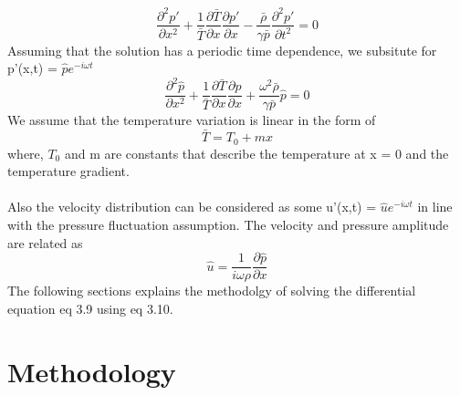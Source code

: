 \documentclass[8pt]{article} %
\begin{document}
\begin{equation}
\frac{\partial^2 p'}{\partial x^2} + \frac{1}{\bar{T}} \frac{\partial \bar{T}}{\partial x} \frac{\partial p'}{\partial x} - \frac{\bar{\rho}}{\gamma \bar{p} } \frac{\partial^2 p'}{\partial t^2} = 0
\end{equation}
Assuming that the solution has a periodic time dependence, we subsitute for p'(x,t) = $\hat{p} e^{- i \omega t}$
\begin{equation}
\frac{\partial^2 \hat{p}}{\partial x^2} + \frac{1}{\bar{T}} \frac{\partial \bar{T}}{\partial x} \frac{\partial \hat{p}}{\partial x} + \frac{\omega^2 \bar{\rho}}{\gamma \bar{p} } \hat{p} = 0
\end{equation}\label{eq:3.9}
We assume that the temperature variation is linear in the form of
\begin{equation}
	\bar{T} = T_0 + m x
\end{equation}
where, $T_0$ and m are constants that describe the temperature at x = 0 and the temperature gradient.\\\\
Also the velocity distribution can be considered as some u'(x,t) = $\hat{u} e^{- i \omega t}$ in line with the pressure fluctuation assumption. The velocity and pressure amplitude are related as
\begin{equation}
	\hat{u} = \frac{1}{i \omega \rho} \frac{\partial \hat{p}}{\partial x}
\end{equation}
The following sections explains the methodolgy of solving the differential equation eq 3.9 using eq 3.10.

\section{Methodology}
\end{document}
